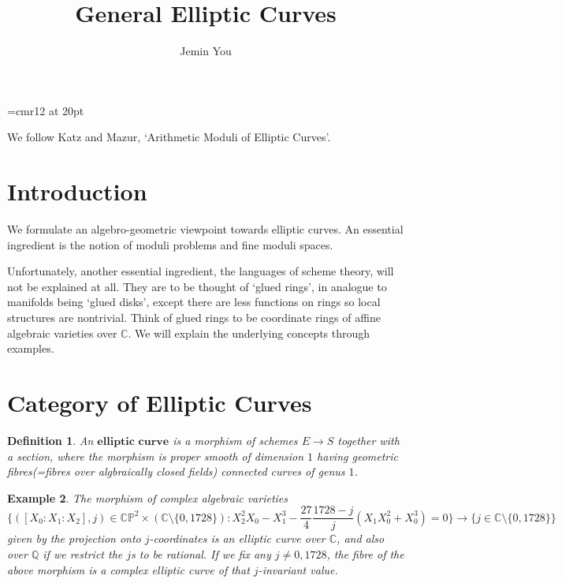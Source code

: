 \documentclass[a4paper,11pt]{article}
\begin{document}
\theoremstyle{plain}
\newtheorem{thm}{Theorem}[section]
\newtheorem{defn}[thm]{Definition}
\newtheorem{exm}[thm]{Example}
\newtheorem{prp}[thm]{Proposition}
\newtheorem{rem}[thm]{Remark}
\newtheorem{lem}[thm]{Lemma}
\newtheorem{nota}[thm]{Notation}

\font\myfont=cmr12 at 20pt

\title{\vspace{-5ex} \myfont General Elliptic Curves}
\author{Jemin You}
\date{\vspace{-5ex}}
\maketitle

\setcounter{section}{-1}

We follow Katz and Mazur, `Arithmetic Moduli of Elliptic Curves'.

\section{Introduction}

We formulate an algebro-geometric viewpoint towards elliptic curves.
An essential ingredient is the notion of moduli problems and fine moduli spaces.

Unfortunately, another essential ingredient, the languages of scheme theory, will not be explained at all.
They are to be thought of `glued rings', in analogue to manifolds being `glued disks', except there are less functions on rings so local structures are nontrivial.
Think of glued rings to be coordinate rings of affine algebraic varieties over $\mathbb{C}$.
We will explain the underlying concepts through examples.

\section{Category of Elliptic Curves}
\begin{defn}
An $\textbf{elliptic curve}$ is a morphism of schemes $E\to$$S$ together with a section, where the morphism is proper smooth of dimension $1$ having geometric fibres(=fibres over algbraically closed fields) connected curves of genus $1$.
\end{defn}

\begin{exm}
The morphism of complex algebraic varieties
\[
\{([X_0:X_1:X_2],j) \in \mathbb{CP}^2\times(\mathbb{C}\setminus\{0,1728\}):X_2^2X_0-X_1^3-\frac{27}{4}\frac{1728-j}{j}(X_1X_0^2+X_0^3)=0\} \to \{j \in \mathbb{C} \setminus \{0,1728\}\}
\]
given by the projection onto $j$-coordinates is an elliptic curve over $\mathbb{C}$, and also over $\mathbb{Q}$ if we restrict the $j$s to be rational.
If we fix any $j\neq0,1728$, the fibre of the above morphism is a complex elliptic curve of that $j$-invariant value.
\end{exm}
\end{document}
